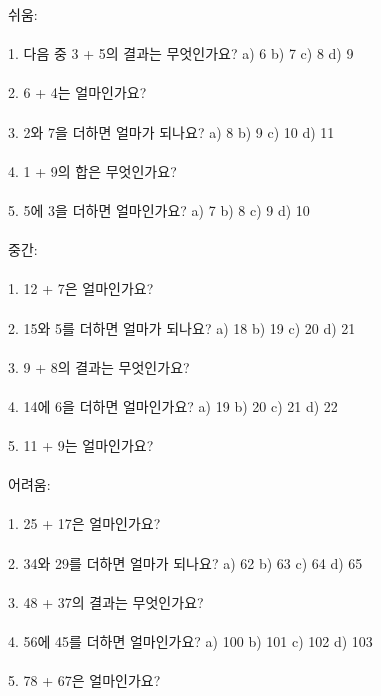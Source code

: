 \documentclass[fleqn]{article}
\begin{document}
      
         쉬움: \\\\
1. 다음 중 3 + 5의 결과는 무엇인가요?  
   a) 6  
   b) 7  
   c) 8  
   d) 9 \\\\
2. 6 + 4는 얼마인가요? \\\\
3. 2와 7을 더하면 얼마가 되나요?  
   a) 8  
   b) 9  
   c) 10  
   d) 11 \\\\
4. 1 + 9의 합은 무엇인가요? \\\\
5. 5에 3을 더하면 얼마인가요?  
   a) 7  
   b) 8  
   c) 9  
   d) 10 \\\\

 중간: \\\\
1. 12 + 7은 얼마인가요? \\\\
2. 15와 5를 더하면 얼마가 되나요?  
   a) 18  
   b) 19  
   c) 20  
   d) 21 \\\\
3. 9 + 8의 결과는 무엇인가요? \\\\
4. 14에 6을 더하면 얼마인가요?  
   a) 19  
   b) 20  
   c) 21  
   d) 22 \\\\
5. 11 + 9는 얼마인가요? \\\\

 어려움: \\\\
1. 25 + 17은 얼마인가요? \\\\
2. 34와 29를 더하면 얼마가 되나요?  
   a) 62  
   b) 63  
   c) 64  
   d) 65 \\\\
3. 48 + 37의 결과는 무엇인가요? \\\\
4. 56에 45를 더하면 얼마인가요?  
   a) 100  
   b) 101  
   c) 102  
   d) 103 \\\\
5. 78 + 67은 얼마인가요? \\\\

      
        
\end{document}
